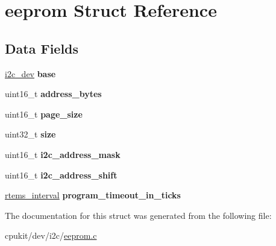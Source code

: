 \hypertarget{structeeprom}{}\section{eeprom Struct Reference}
\label{structeeprom}
\subsection*{Data Fields}
\begin{DoxyCompactItemize}
\item 
\mbox{\label{structeeprom_a1d5a4ffa232b8625bc161d1a4215690f}} 
\mbox{\hyperlink{structi2c__dev}{i2c\+\_\+dev}} {\bfseries base}
\item 
\mbox{\label{structeeprom_a4f60348129723515f23636992c44f8d4}} 
uint16\+\_\+t {\bfseries address\+\_\+bytes}
\item 
\mbox{\label{structeeprom_a4e097d0ad48579f9915987826a306ba0}} 
uint16\+\_\+t {\bfseries page\+\_\+size}
\item 
\mbox{\label{structeeprom_ab20e72156fcccd6e59de994c2cb5d3a6}} 
uint32\+\_\+t {\bfseries size}
\item 
\mbox{\label{structeeprom_a21b83249fa26934fa03e15c951f73554}} 
uint16\+\_\+t {\bfseries i2c\+\_\+address\+\_\+mask}
\item 
\mbox{\label{structeeprom_a0615bfc283d587a03e6c6a40a25e8ad5}} 
uint16\+\_\+t {\bfseries i2c\+\_\+address\+\_\+shift}
\item 
\mbox{\label{structeeprom_a2613b5cfe8270e43760200d48a133e2f}} 
\mbox{\hyperlink{group__ClassicTasks_gad39c43f949683d46874e3a5586b93aee}{rtems\+\_\+interval}} {\bfseries program\+\_\+timeout\+\_\+in\+\_\+ticks}
\end{DoxyCompactItemize}


The documentation for this struct was generated from the following file\+:\begin{DoxyCompactItemize}
\item 
cpukit/dev/i2c/\mbox{\hyperlink{eeprom_8c}{eeprom.\+c}}\end{DoxyCompactItemize}
